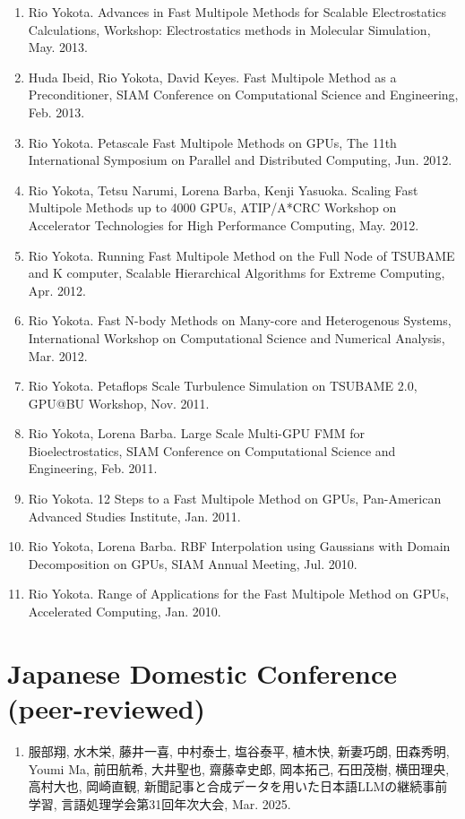 \documentclass[margin,line]{cv}
\begin{document}
\begin{resume}
\begin{enumerate}
\item Rio Yokota. Advances in Fast Multipole Methods for Scalable Electrostatics Calculations, Workshop: Electrostatics methods in Molecular Simulation, May. 2013.

\item Huda Ibeid, Rio Yokota, David Keyes. Fast Multipole Method as a Preconditioner, SIAM Conference on Computational Science and Engineering, Feb. 2013.

\item Rio Yokota. Petascale Fast Multipole Methods on GPUs, The 11th International Symposium on Parallel and Distributed Computing, Jun. 2012.

\item Rio Yokota, Tetsu Narumi, Lorena Barba, Kenji Yasuoka. Scaling Fast Multipole Methods up to 4000 GPUs, ATIP/A*CRC Workshop on Accelerator Technologies for High Performance Computing, May. 2012.

\item Rio Yokota. Running Fast Multipole Method on the Full Node of TSUBAME and K computer, Scalable Hierarchical Algorithms for Extreme Computing, Apr. 2012.

\item Rio Yokota. Fast N-body Methods on Many-core and Heterogenous Systems, International Workshop on Computational Science and Numerical Analysis, Mar. 2012.

\item Rio Yokota. Petaflops Scale Turbulence Simulation on TSUBAME 2.0, GPU@BU Workshop, Nov. 2011.

\item Rio Yokota, Lorena Barba. Large Scale Multi-GPU FMM for Bioelectrostatics, SIAM Conference on Computational Science and Engineering, Feb. 2011.

\item Rio Yokota. 12 Steps to a Fast Multipole Method on GPUs, Pan-American Advanced Studies Institute, Jan. 2011.

\item Rio Yokota, Lorena Barba. RBF Interpolation using Gaussians with Domain Decomposition on GPUs, SIAM Annual Meeting, Jul. 2010.

\item Rio Yokota. Range of Applications for the Fast Multipole Method on GPUs, Accelerated Computing, Jan. 2010.
\end{enumerate}

\section{\sc Japanese Domestic Conference (peer-reviewed)}
\begin{enumerate}
\item 服部翔, 水木栄, 藤井一喜, 中村泰士, 塩谷泰平, 植木快, 新妻巧朗, 田森秀明, Youmi Ma, 前田航希, 大井聖也, 齋藤幸史郎, 岡本拓己, 石田茂樹, 横田理央, 高村大也, 岡崎直観, 新聞記事と合成データを用いた日本語LLMの継続事前学習, 言語処理学会第31回年次大会, Mar. 2025.


\end{enumerate}
\end{resume}
\end{document}
